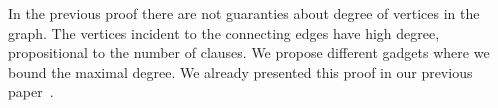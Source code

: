 In the previous proof there are not guaranties about
degree of vertices in the graph. The vertices incident to the connecting edges
have high degree, propositional to the number of clauses.
We propose different gadgets where we bound the maximal degree.
We already presented this proof in our previous paper~\cite{my_paper}.

%
%

